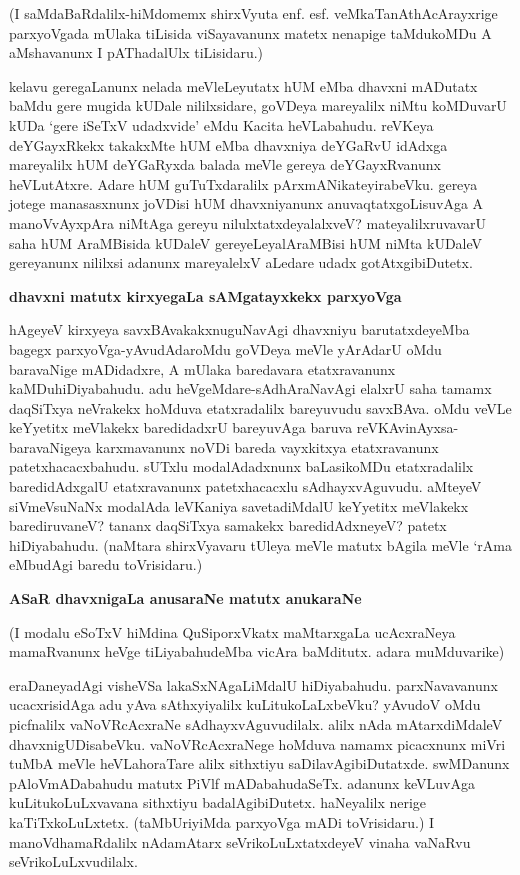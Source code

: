 (I saMdaBaRdalilx-hiMdomemx shirxVyuta enf. esf. veMkaTanAthAcArayxrige 
parxyoVgada mUlaka tiLisida viSayavanunx matetx nenapige taMdukoMDu A aMshavanunx I pAThadalUlx tiLisidaru.)

kelavu geregaLanunx nelada meVleLeyutatx hUM eMba dhavxni mADutatx 
baMdu gere mugida kUDale nililx\-sidare, goVDeya mareyalilx niMtu 
koMDuvarU kUDa `gere iSeTxV udadxvide' eMdu Kacita heVLa\-bahudu. reVKeya 
deYGayxRkekx takakxMte hUM eMba dhavxniya deYGaRvU idAdxga mareyalilx hUM deYGaRyx\-da balada meVle gereya deYGayxRvanunx heVLutAtxre. Adare hUM guTuTxdaralilx pArxmANikateyirabeVku. gereya jotege manasasxnunx joVDisi hUM dhavxniyanunx anuvaqtatxgoLisuvAga A manoVvAyxpAra \-niMtAga gere\-yu nilulxtatxdeyalalxveV? mateyalilxruvavarU saha hUM AraMBisida kUDaleV gere\-yeLeya\-lAraMBisi hUM niMta kUDaleV gereyanunx nililxsi adanunx mareyalelxV aLedare udadx gotAtxgibiDutetx.

{\bigskip
\noindent
{\large\bf dhavxni matutx kirxyegaLa sAMgatayxkekx parxyoVga}}\label{page120}
\medskip

\noindent
  hAgeyeV kirxyeya savxBAvakakxnuguNavAgi dhavxniyu barutatxdeyeMba 
  bagegx parxyoVga\--yAvudAda\-roMdu goVDeya meVle yArAdarU oMdu baravaNige\break 
  mADidadxre, A mUlaka baredavara etatxravanunx kaMDu\-hiDiya\-bahudu. adu heVgeMdare-sAdhAraNavAgi elalxrU saha tamamx daqSiTxya neVrakekx hoMduva etatxra\-dalilx bareyuvudu savxBAva. oMdu veVLe keYyetitx meVlakekx baredidadxrU bareyuvAga baruva reVKA\-vinAyxsa-baravaNigeya karxmavanunx noVDi bareda vayxkitxya etatxravanunx patetxhacacxbahudu. sUTxlu modalA\-dadxnunx baLasikoMDu etatxradalilx baredidAdxgalU etatxravanunx patetxhacacxlu sAdhayxvAguvudu. aMteyeV siVmeVsuNaNx modalAda leVKa\-niya savetadiMdalU keYyetitx meVlakekx bare\-diruvaneV? tananx daqSiTxya samakekx bare\-didAdxneyeV? patetx hiDiyabahudu. (naMtara shirxVyavaru tUleya meVle matutx bAgila meVle `rAma eMbudAgi baredu toVrisidaru.)
  
  {\bigskip
\noindent
{\large\bf ASaR dhavxnigaLa anusaraNe matutx anukaraNe}}
\medskip

\noindent
  (I modalu eSoTxV hiMdina QuSiporxVkatx maMtarxgaLa ucAcxraNeya mamaRvanunx heVge tiLiya\-bahu\-deMba vicAra baMditutx. adara muMduvarike) 
  
    eraDaneyadAgi visheVSa lakaSxNAgaLiMdalU hiDiyabahudu. parxNavavanunx ucacxrisidAga adu yAva sAthxyiyalilx kuLitukoLaLxbeVku? yAvudoV oMdu picfnalilx vaNoVRcAcxraNe sAdhayxvAguvudilalx. alilx nAda mAtarxdiMdaleV dhavxnigUDisabeVku. vaNoVRcAcxraNege hoMduva namamx picacxnunx miVri tuMbA meVle heVLahoraTare alilx sithxtiyu saDilavAgibiDutatxde. swMDanunx pAloVmADabahudu matutx PiVlf mADabahudaSeTx. adanunx keVLuvAga kuLitukoLuLxvavana sithxtiyu badalAgibiDutetx. haNeyalilx nerige kaTiTxkoLuLxtetx. (taMbUriyiMda parxyoVga mADi toVrisidaru.) I manoVdhamaRdalilx nAdamAtarx seVrikoLuLxtatxdeyeV vinaha vaNaRvu seVrikoLuLxvudilalx.
  
